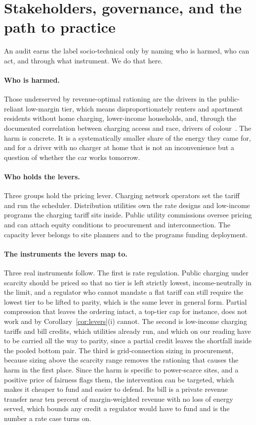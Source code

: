 \documentclass[manuscript, screen, review, anonymous]{acmart}
\begin{document}
\section{Stakeholders, governance, and the path to practice}
\label{sec:practice}

An audit earns the label socio-technical only by naming who is harmed, who can act, and through what instrument. We do that here.

\paragraph{Who is harmed.}
Those underserved by revenue-optimal rationing are the drivers in the public-reliant low-margin tier, which means disproportionately renters and apartment residents without home charging, lower-income households, and, through the documented correlation between charging access and race, drivers of colour~\cite{hsu2021public,khan2022inequitable}. The harm is concrete. It is a systematically smaller share of the energy they came for, and for a driver with no charger at home that is not an inconvenience but a question of whether the car works tomorrow.

\paragraph{Who holds the levers.}
Three groups hold the pricing lever. Charging network operators set the tariff and run the scheduler. Distribution utilities own the rate designs and low-income programs the charging tariff sits inside. Public utility commissions oversee pricing and can attach equity conditions to procurement and interconnection. The capacity lever belongs to site planners and to the programs funding deployment.

\paragraph{The instruments the levers map to.}
Three real instruments follow. The first is rate regulation. Public charging under scarcity should be priced so that no tier is left strictly lowest, income-neutrally in the limit, and a regulator who cannot mandate a flat tariff can still require the lowest tier to be lifted to parity, which is the same lever in general form. Partial compression that leaves the ordering intact, a top-tier cap for instance, does not work and by Corollary~\ref{cor:levers}(i) cannot. The second is low-income charging tariffs and bill credits, which utilities already run, and which on our reading have to be carried all the way to parity, since a partial credit leaves the shortfall inside the pooled bottom pair. The third is grid-connection sizing in procurement, because sizing above the scarcity range removes the rationing that causes the harm in the first place. Since the harm is specific to power-scarce sites, and a positive price of fairness flags them, the intervention can be targeted, which makes it cheaper to fund and easier to defend. Its bill is a private revenue transfer near ten percent of margin-weighted revenue with no loss of energy served, which bounds any credit a regulator would have to fund and is the number a rate case turns on.
\end{document}
